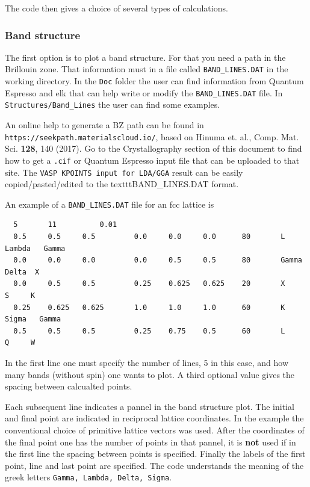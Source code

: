 \documentclass[11pt]{article}
\begin{document}
The code then gives a choice of several types of calculations.

\subsubsection{Band structure}

The first option is to plot a band structure.  For that you need a path in the
Brillouin zone.  That information must in a file called \texttt{BAND\_LINES.DAT}
in the working directory.
In the \texttt{Doc} folder the user can find information
from {\sc Quantum Espresso} and  {\sc elk} that can help write or modify
the \texttt{BAND\_LINES.DAT} file.
In \texttt{Structures/Band\_Lines} the user can find some examples.

An online help to generate a BZ path can be found in \texttt{https://seekpath.materialscloud.io/},
based on Hinuma et. al., Comp. Mat. Sci. {\bf 128}, 140 (2017).
Go to the Crystallography section of this document to find how to get a \texttt{.cif}
or {\sc Quantum Espresso} input file that can be uploaded to that site.
The \texttt{VASP KPOINTS input for LDA/GGA} result can be easily copied/pasted/edited
to the texttt{BAND\_LINES.DAT} format.

An example of a \texttt{BAND\_LINES.DAT} file for an fcc lattice is
\begin{verbatim}
  5       11          0.01
  0.5     0.5     0.5         0.0     0.0     0.0      80       L   Lambda   Gamma
  0.0     0.0     0.0         0.0     0.5     0.5      80       Gamma  Delta  X
  0.0     0.5     0.5         0.25    0.625   0.625    20       X       S     K
  0.25    0.625   0.625       1.0     1.0     1.0      60       K    Sigma   Gamma
  0.5     0.5     0.5         0.25    0.75    0.5      60       L      Q     W
\end{verbatim}
In the first line one must specify the number of lines, 5 in this case, and
how many bands (without spin) one wants to plot.  A third optional value
gives the spacing between calcualted points.

Each subsequent line indicates a pannel in the band structure plot.
The initial and final point are indicated in reciprocal lattice
coordinates.  In the example the conventional choice of
primitive lattice vectors was used.  After the coordinates of the final point
one has the number of points in that pannel, it is {\bf not} used if in the first
line the spacing between points is specified.  Finally the
labels of the first point, line and last point are specified.
The code understands the meaning of the greek letters \texttt{Gamma, Lambda, Delta, Sigma}.
\end{document}
